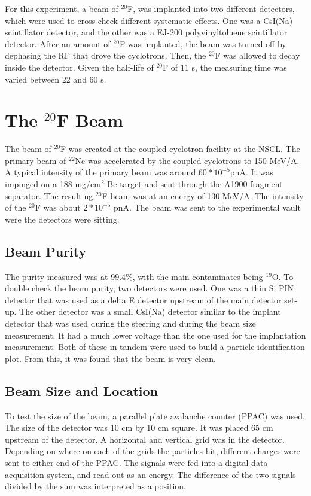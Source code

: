 \documentclass[../MaxHughesThesis.tex]{subfiles}
\begin{document}
For this experiment, a  beam of  $^{20}$F, was implanted into two different detectors, which were used to cross-check different systematic effects.
One was a CsI(Na) scintillator detector, and the other was a  EJ-200 polyvinyltoluene scintillator detector. 
After an amount of $^{20}$F was implanted, the beam was turned off by dephasing the RF that drove the cyclotrons.
Then, the $^{20}$F was allowed to decay inside the detector. 
Given the half-life of $^{20}$F of 11 s, the measuring time was varied between 22 and 60 s.

\section{The $^{20}$F Beam}

The beam of $^{20}$F was created at the coupled cyclotron facility at the NSCL.
The primary beam of $^{22}$Ne was accelerated by the coupled cyclotrons to 150 MeV/A. 
A typical intensity of the primary beam was around $60 * 10^{-5}$pnA.
It was impinged on a 188 mg/cm$^{2}$ Be target and sent through the A1900 fragment separator. 
The resulting $^{20}$F beam was at an energy of 130 MeV/A. 
The intensity of the $^{20}$F was about $2 * 10^{-5}$ pnA.
The beam was sent to the experimental vault were the detectors were sitting.
\subsection{Beam Purity}

The purity measured was at 99.4\%, with the main contaminates being  $^{19}$O. 
To double check the beam purity, two detectors were used. 
One was a thin Si PIN detector that was used as a delta E detector upstream of the main detector set-up. 
The other detector was a small CsI(Na) detector similar to the implant detector that was used during the steering and during the beam size measurement. 
It had a much lower voltage than the one used for the implantation measurement. 
Both of these in tandem were used to build a particle identification plot.
From this, it was found that the beam is very clean.

\subsection{Beam Size and Location}
To test the size of the beam, a parallel plate avalanche counter (PPAC) was used.
The size of the detector was 10 cm by 10 cm square. 
It was placed 65 cm upstream of the detector.
A horizontal and vertical grid was in the detector.
Depending on where on each of the grids the particles hit, different charges were sent to either end of the PPAC.
The signals were fed into a digital data acquisition system, and read out as an energy.
The difference of the two signals divided by the sum was interpreted as a position.
\end{document}
